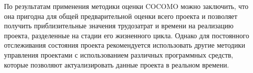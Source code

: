 По результатам применения методики оценки COCOMO можно
заключить, что она пригодна для общей предварительной оценки всего проекта
и позволяет получить приблизительные значения трудозатрат и времени на
реализацию проекта, разделенные на стадии его жизненного цикла. Однако для
постоянного отслеживания состояния проекта рекомендуется использовать
другие методики управления проектами с использованием различных
программных средств, которые позволяют актуализировать данные проекта в
реальном времени.